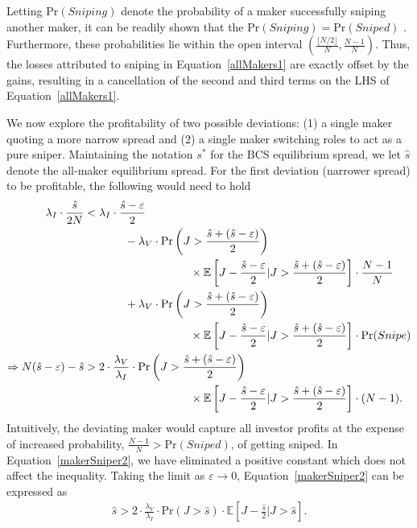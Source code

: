 \documentclass[12pt]{article}
\begin{document}
\begin{appendices}
Letting $\textrm{Pr}(Sniping)$ denote the probability of a maker successfully sniping another maker, it can be readily shown that the $\textrm{Pr}(Sniping) = \textrm{Pr}(Sniped)$ \citep[e.g. the High School Prom Theorem -- see][]{Davis2009}. Furthermore, these probabilities lie within the open interval $\left(\frac{ \lfloor N/2 \rfloor}{N}, \frac{N-1}{N}\right)$. Thus, the losses attributed to sniping in Equation~\eqref{allMakers1} are exactly offset by the gains, resulting in a cancellation of the second and third terms on the LHS of Equation~\eqref{allMakers1}.

We now explore the profitability of two possible deviations: (1) a single maker quoting a more narrow spread and (2) a single maker switching roles to act as a pure sniper. Maintaining the notation $s^*$ for the BCS equilibrium spread, we let $\hat{s}$ denote the all-maker equilibrium spread. For the first deviation (narrower spread) to be profitable, the following would need to hold
\begin{align}
\lambda_I\cdot\frac{\hat{s}}{2N} & < \lambda_I\cdot\frac{\hat{s}-\varepsilon}{2} \nonumber \\
& \hspace{0.5in} -\lambda_V\cdot\textrm{Pr}\left(J>\frac{\hat{s}+(\hat{s}-\varepsilon)}{2}\right) \nonumber \\
& \hspace{1.3in} \times \mathbb{E}\left[J-\frac{\hat{s}-\varepsilon}{2}|J>\frac{\hat{s}+(\hat{s}-\varepsilon)}{2}\right]\cdot\frac{N-1}{N} \\
& \hspace{0.5in} +\lambda_V\cdot\textrm{Pr}\left(J>\frac{\hat{s}+(\hat{s}-\varepsilon)}{2}\right) \nonumber \\
& \hspace{1.3in} \times \mathbb{E}\left[J-\frac{\hat{s}-\varepsilon}{2}|J>\frac{\hat{s}+(\hat{s}-\varepsilon)}{2}\right]\cdot \textrm{Pr}(Snipe) \label{makerSniper1} \\
\Rightarrow N(\hat{s}-\varepsilon) - \hat{s} & > 2 \cdot \frac{\lambda_V}{\lambda_I} \cdot \textrm{Pr}\left(J>\frac{\hat{s}+(\hat{s}-\varepsilon)}{2}\right) \nonumber \\
& \hspace{1.3in} \times \mathbb{E}\left[J-\frac{\hat{s}-\varepsilon}{2}|J>\frac{\hat{s}+(\hat{s}-\varepsilon)}{2}\right] \cdot (N-1). \label{makerSniper2}
\end{align}
Intuitively, the deviating maker would capture all investor profits at the expense of increased probability, $\frac{N-1}{N} > \textrm{Pr}(Sniped)$, of getting sniped. In Equation~\eqref{makerSniper2}, we have eliminated a positive constant which does not affect the inequality. Taking the limit as $\varepsilon \to 0$, Equation~\eqref{makerSniper2} can be expressed as
\begin{align}
\hat{s} > 2 \cdot \frac{\lambda_V}{\lambda_I} \cdot \textrm{Pr}\left(J>\hat{s}\right)\cdot\mathbb{E}\left[J-\frac{\hat{s}}{2}|J>\hat{s}\right]. \label{deviation1}
\end{align}


\end{appendices}
\end{document}
